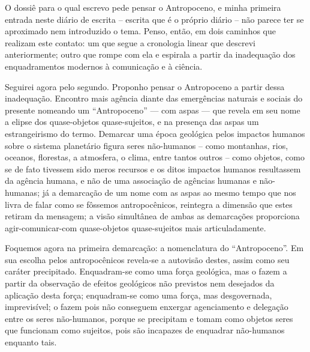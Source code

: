 
O dossiê para o qual escrevo pede pensar o Antropoceno, e minha primeira entrada neste diário de escrita -- escrita que é o próprio diário -- não parece ter se aproximado nem introduzido o tema. Penso, então, em dois caminhos que realizam este contato: um que  segue a cronologia linear que descrevi anteriormente; outro que rompe com ela e espirala a partir da inadequação dos enquadramentos modernos à comunicação e à ciência.

Seguirei agora pelo segundo. Proponho pensar o Antropoceno a partir dessa inadequação. Encontro mais agência diante das emergências naturais e sociais do presente nomeando um \enquote{Antropoceno} --- com aspas --- que revela em seu nome a elipse dos quase-objetos quase-sujeitos, e na presença das aspas um estrangeirismo do termo. Demarcar uma época geológica pelos  impactos humanos sobre o sistema planetário figura seres não-humanos -- como montanhas, rios, oceanos, florestas, a atmosfera, o clima, entre tantos outros -- como objetos, como se de fato tivessem sido meros recursos e os ditos impactos humanos resultassem da agência humana, e não de uma associação de agências humanas e não-humanas; já a demarcação de um nome com as aspas ao mesmo tempo que nos livra de falar como se fôssemos antropocênicos, reintegra a dimensão que estes retiram da mensagem; a visão simultânea de ambas as demarcações proporciona agir-comunicar-com quase-objetos quase-sujeitos  mais articuladamente.

Foquemos agora na primeira demarcação: a nomenclatura do \enquote{Antropoceno}. Em sua escolha pelos antropocênicos revela-se a autovisão destes, assim como seu caráter precipitado. Enquadram-se como uma força geológica, mas o fazem a partir da observação de efeitos geológicos não previstos nem desejados da aplicação desta força; enquadram-se como uma força,  mas desgovernada, imprevisível; o fazem pois não conseguem enxergar agenciamento e delegação entre os seres não-humanos, porque se precipitam e tomam como objetos seres que funcionam como sujeitos, pois são incapazes de enquadrar não-humanos enquanto tais.

